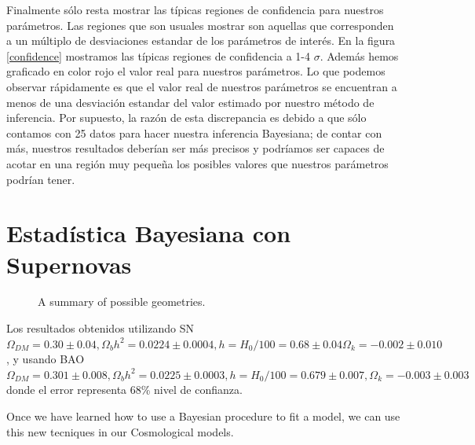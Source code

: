 \documentclass[10.5pt,prb,
               showpacs,            %
               preprintnumbers,     %
               aps,                 %
               prl,          	    %
               letterpaper,             %
               superscriptaddress,      %
               nofootinbib,         %
               tightenlines,        %
               floats,floatfix      %
               ,usenatbib]{revtex4-1}%
\newcommand{\jav}[1]{\textcolor{red}{(jav: #1)}}
\begin{document}
Finalmente s\'olo resta mostrar las t\'ipicas regiones de confidencia para nuestros par\'ametros. Las regiones que son usuales mostrar son aquellas que corresponden a un m\'ultiplo de desviaciones estandar de los par\'ametros de inter\'es. En la figura \ref{confidence} mostramos las t\'ipicas regiones de confidencia a 1-4 $\sigma$. Adem\'as hemos graficado en color rojo el valor real para nuestros par\'ametros. Lo que podemos observar r\'apidamente es que el valor real de nuestros par\'ametros se encuentran a menos de una desviaci\'on estandar del valor estimado por nuestro m\'etodo de inferencia. Por supuesto, la raz\'on de esta discrepancia es debido a que s\'olo contamos con 25 datos para hacer nuestra inferencia Bayesiana; de contar con m\'as, nuestros resultados deber\'ian ser m\'as precisos y podr\'iamos ser capaces de acotar en una regi\'on muy peque\~na los posibles valores que nuestros par\'ametros podr\'ian tener.  


\section{Estad\'istica Bayesiana con Supernovas}



\begin{figure}[h]
\begin{center}
\end{center}
\caption[Geometries of the spacetime]
{A summary of possible geometries.}
\label{Fig:cmb_sh}
\end{figure}

Los resultados obtenidos utilizando SN $\Omega_{DM} =0.30 \pm 0.04, \Omega_b h^2 = 0.0224 \pm 0.0004, h = H_0/100 = 0.68 \pm 0.04
\Omega_k = -0.002 \pm 0.010$, y usando BAO 
$\Omega_{DM} = 0.301 \pm 0.008,   \Omega_b h^2 = 0.0225 \pm 0.0003,  h = H_0/100 = 0.679 \pm 0.007, 
\Omega_k = -0.003 \pm 0.003$ donde el error representa 68\% nivel de confianza.



Once we have learned how to use a Bayesian procedure to fit a model, we can use this new tecniques in our Cosmological models. 





\end{document}
